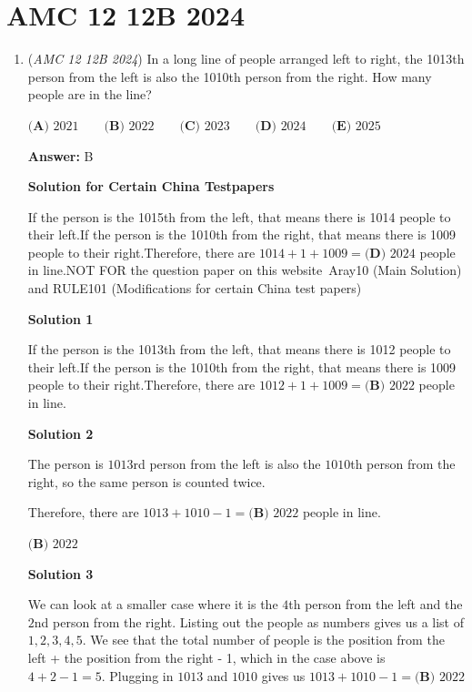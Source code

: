 \section{AMC 12 12B 2024}
        \begin{enumerate}
        	\item (\textit{AMC 12 12B 2024}) In a long line of people arranged left to right, the 1013th person from the left is also the 1010th person from the right. How many people are in the line?


 $\textbf{(A) } 2021 \qquad\textbf{(B) } 2022 \qquad\textbf{(C) } 2023 \qquad\textbf{(D) } 2024 \qquad\textbf{(E) } 2025$

 \textbf{Answer: }B



\textbf{Solution for Certain China Testpapers}

If the person is the 1015th from the left, that means there is 1014 people to their left.If the person is the 1010th from the right, that means there is 1009 people to their right.Therefore, there are $1014 + 1 + 1009 = \boxed{\textbf{(D) } 2024}$ people in line.NOT FOR the question paper on this website~Aray10 (Main Solution) and RULE101 (Modifications for certain China test papers)

 



\textbf{Solution 1}

If the person is the 1013th from the left, that means there is 1012 people to their left.If the person is the 1010th from the right, that means there is 1009 people to their right.Therefore, there are $1012 + 1 + 1009 = \boxed{\textbf{(B) } 2022}$ people in line.

 



\textbf{Solution 2}

The person is $1013$rd person from the left is also the $1010$th person from the right, so the same person is counted twice.

 Therefore, there are $1013+1010-1=\boxed{\textbf{(B) } 2022}$ people in line.

 $\boxed{\textbf{(B) } 2022}$




\textbf{Solution 3}

We can look at a smaller case where it is the $4$th person from the left and the $2$nd person from the right. Listing out the people as numbers gives us a list of $1,2,3,4,5.$ We see that the total number of people is the position from the left + the position from the right - 1, which in the case above is $4+2-1=5.$ Plugging in $1013$ and $1010$ gives us $1013+1010-1=\boxed{\textbf{(B) } 2022}$





\end{enumerate}
